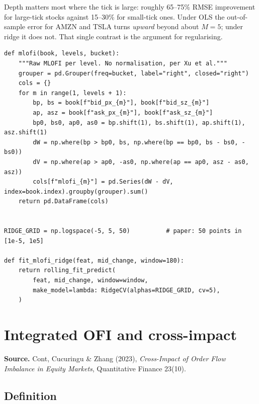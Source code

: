 \documentclass[11pt]{article}
\begin{document}
Depth matters most where the tick is large: roughly 65--75\% RMSE improvement
for large-tick stocks against 15--30\% for small-tick ones. Under OLS the
out-of-sample error for AMZN and TSLA turns \emph{upward} beyond about $M=5$;
under ridge it does not. That single contrast is the argument for regularising.

\begin{lstlisting}[caption={MLOFI with ridge, cross-validated as in the paper.}]
def mlofi(book, levels, bucket):
    """Raw MLOFI per level. No normalisation, per Xu et al."""
    grouper = pd.Grouper(freq=bucket, label="right", closed="right")
    cols = {}
    for m in range(1, levels + 1):
        bp, bs = book[f"bid_px_{m}"], book[f"bid_sz_{m}"]
        ap, asz = book[f"ask_px_{m}"], book[f"ask_sz_{m}"]
        bp0, bs0, ap0, as0 = bp.shift(1), bs.shift(1), ap.shift(1), asz.shift(1)
        dW = np.where(bp > bp0, bs, np.where(bp == bp0, bs - bs0, -bs0))
        dV = np.where(ap > ap0, -as0, np.where(ap == ap0, asz - as0, asz))
        cols[f"mlofi_{m}"] = pd.Series(dW - dV, index=book.index).groupby(grouper).sum()
    return pd.DataFrame(cols)


RIDGE_GRID = np.logspace(-5, 5, 50)          # paper: 50 points in [1e-5, 1e5]

def fit_mlofi_ridge(feat, mid_change, window=180):
    return rolling_fit_predict(
        feat, mid_change, window=window,
        make_model=lambda: RidgeCV(alphas=RIDGE_GRID, cv=5),
    )
\end{lstlisting}

\section{Integrated OFI and cross-impact}\label{sec:iofi}

\textbf{Source.} Cont, Cucuringu \& Zhang (2023), \emph{Cross-Impact of Order
Flow Imbalance in Equity Markets}, Quantitative Finance 23(10).

\subsection{Definition}
\end{document}
